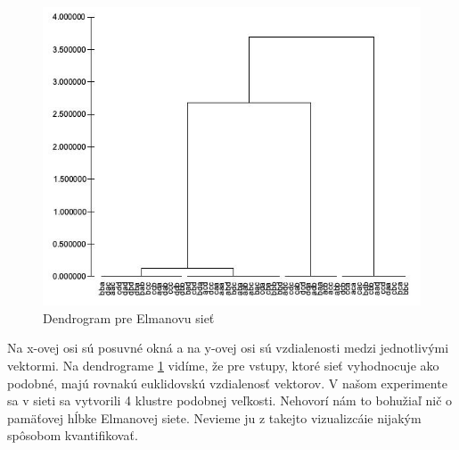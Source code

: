 \begin{figure}[H]
    \centering
    \includegraphics[width=\textwidth]{assets/dendrogram}
    \caption{Dendrogram pre Elmanovu sieť}
    \label{dendrogram}
\end{figure}
Na x-ovej osi sú posuvné okná a na y-ovej osi sú vzdialenosti medzi jednotlivými vektormi.
Na dendrograme \ref{dendrogram} vidíme, že pre vstupy, ktoré sieť vyhodnocuje ako podobné, majú rovnakú euklidovskú vzdialenosť vektorov.
V našom experimente sa v sieti sa vytvorili 4 klustre podobnej veľkosti. Nehovorí nám to bohužiaľ nič o pamäťovej hĺbke Elmanovej siete.
Nevieme ju z takejto vizualizcáie nijakým spôsobom kvantifikovať.

